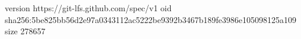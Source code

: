 version https://git-lfs.github.com/spec/v1
oid sha256:5be825bb56d2e97a0343112ac5222be9392b3467b189fe3986e105098125a109
size 278657
